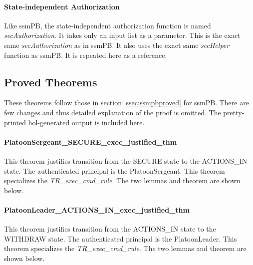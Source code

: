 \documentclass[../../main/main.tex]{subfiles}
\begin{document}
\paragraph*{State-independent Authorization}
Like ssmPB, the state-independent authorization function is named \textit{secAuthorization}.  It takes only an input list as a parameter.  This is the exact same \textit{secAuthorization} as in ssmPB. It also uses the exact same \textit{secHelper} function as ssmPB.  It is repeated here as a reference.
 

\HOLConductORPDefDefinitionssecAuthorizationXXdef

\HOLConductORPDefDefinitionssecHelperXXdef


\subsection{Proved Theorems}
These theorems follow those in section \ref{ssec:ssmpbproved} for ssmPB.  There are few changes and thus detailed explanation of the proof is omitted.  The pretty-printed \gls{hol}-generated output is included here.

\paragraph*{PlatoonSergeant_SECURE_exec_justified_thm}
This theorem justifies transition from the SECURE state to the ACTIONS_IN  state.  The authenticated principal is the PlatoonSergeant.  This theorem specializes the \textit{TR_exec_cmd_rule}.  The two lemmas and theorem are shown below.

\HOLssmConductORPTheoremsPlatoonSergeantXXSECUREXXexecXXlemma
{}\HOLssmConductORPTheoremsPlatoonSergeantXXSECUREXXexecXXjustifiedXXlemma
\HOLssmConductORPTheoremsPlatoonSergeantXXSECUREXXexecXXjustifiedXXthm

\paragraph*{PlatoonLeader_ACTIONS_IN_exec_justified_thm}
This theorem justifies transition from the ACTIONS_IN state to the WITHDRAW state.  The authenticated principal is the PlatoonLeader.  This theorem specializes the \textit{TR_exec_cmd_rule}.  The two lemmas and theorem are shown below.
\end{document}
